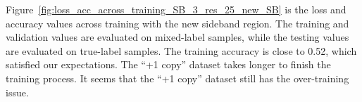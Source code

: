 \documentclass[12pt]{article}
\begin{document}
		Figure~\ref{fig:loss_acc_across_training_SB_3_res_25_new_SB} is the loss and accuracy values across training with the new sideband region. The training and validation values are evaluated on mixed-label samples, while the testing values are evaluated on true-label samples. The training accuracy is close to 0.52, which satisfied our expectations. The ``+1 copy'' dataset takes longer to finish the training process. It seems that the ``+1 copy'' dataset still has the over-training issue.
		\begin{figure}[htpb]
			\centering
			 \\
\end{figure}
\end{document}
